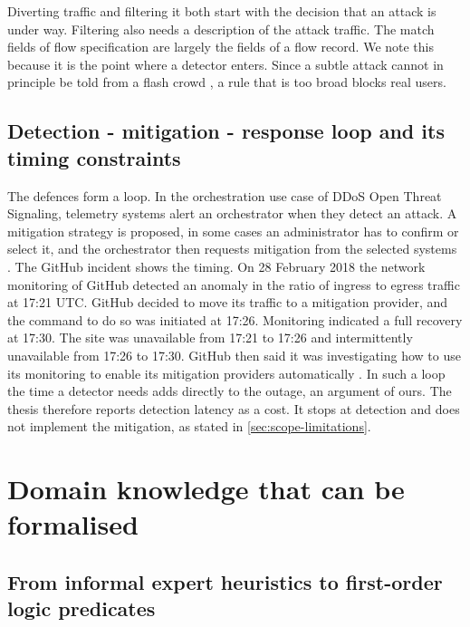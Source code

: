 Diverting traffic and filtering it both start with the decision that an
attack is under way. Filtering also needs a description of the attack
traffic. The match fields of flow specification are largely the fields of a
flow record. We note this because it is the point where a detector enters.
Since a subtle attack cannot in principle be told from a flash crowd
\citep{handley2006rfc4732}, a rule that is too broad blocks real users.

\subsection{Detection - mitigation - response loop and its timing constraints}
\label{sec:detection-mitigation-loop}

The defences form a loop. In the orchestration use case of DDoS Open Threat
Signaling, telemetry systems alert an orchestrator when they detect an
attack. A mitigation strategy is proposed, in some cases an administrator has
to confirm or select it, and the orchestrator then requests mitigation from
the selected systems \citep{dobbins2021rfc8903}. The GitHub incident shows
the timing. On 28 February 2018 the network monitoring of GitHub detected an
anomaly in the ratio of ingress to egress traffic at 17:21 UTC. GitHub
decided to move its traffic to a mitigation provider, and the command to do
so was initiated at 17:26. Monitoring indicated a full recovery at 17:30. The
site was unavailable from 17:21 to 17:26 and intermittently unavailable from
17:26 to 17:30. GitHub then said it was investigating how to use its
monitoring to enable its mitigation providers automatically
\citep{kottler2018github}. In such a loop the time a detector needs adds
directly to the outage, an argument of ours. The thesis therefore reports
detection latency as a cost. It stops at detection and does not implement the
mitigation, as stated in \cref{sec:scope-limitations}.

\section{Domain knowledge that can be formalised}
\label{sec:domain-knowledge-formalisation}

\subsection{From informal expert heuristics to first-order logic predicates}
\label{sec:heuristics-to-predicates}

